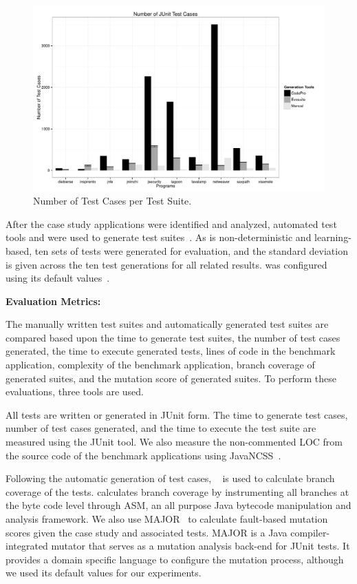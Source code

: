 \begin{figure}[!t]
\centering
  \includegraphics[scale=0.5]{RGraphs/TestCasesGenerated.pdf}
    \caption{Number of Test Cases per Test Suite.}
  \label{fig:NumTests}
\end{figure}

After the case study applications were identified and analyzed, automated test tools \evo and \codepro were used to generate test suites~\cite{CodePro1, fraser:2011:eat:2025113.2025179}. As \evo is non-deterministic and learning-based, ten sets of tests were generated for evaluation, and the standard deviation is given across the ten test generations for all \evo related results.  \evo was configured using its default values~\cite{arcuri2013}.

\noindent \textbf{Evaluation Metrics:}

The manually written test suites and automatically generated test suites are compared based upon the time to generate test suites, the number of test cases generated, the time to execute generated tests, lines of code in the benchmark application, complexity of the benchmark application, branch coverage of generated suites, and the mutation score of generated suites. To perform these evaluations, three tools are used.

All tests are written or generated in JUnit form.  The time to generate test cases, number of test cases generated, and the time to execute the test suite are measured using the JUnit tool.  We also measure the non-commented LOC from the source code of the benchmark applications using JavaNCSS~\cite{leejavancss}.  

Following the automatic generation of test cases, \jacoco~\cite{jacoco} is used to calculate branch coverage of the tests.  \jacoco calculates branch coverage by instrumenting all branches at the byte code level through ASM, an all purpose Java bytecode manipulation and analysis framework. We also use MAJOR~\cite{just2011} to calculate fault-based mutation scores given the case study and associated tests. MAJOR is a Java compiler-integrated mutator that serves as a mutation analysis back-end for JUnit tests.  It provides a domain specific language to configure the mutation process, although we used its default values for our experiments.

